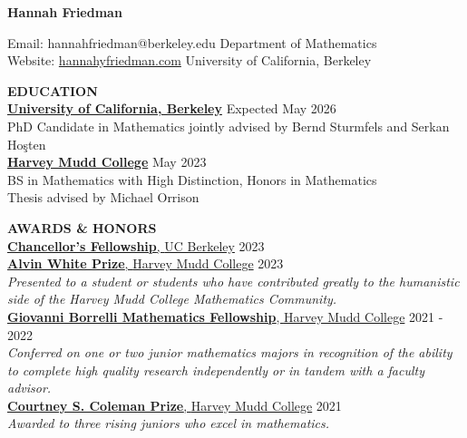 \documentclass[11pt]{article}
\newcommand{\hdr}[1]{\textcolor{blue(ryb)}{\textbf{#1}}}
\newcommand{\role}[3]{\underline{\textbf{#1}, {#2}} \hfill #3}
\begin{document}
\begin{center}
\hdr{\Large{Hannah Friedman}}\\
\end{center}
Email: hannahfriedman@berkeley.edu \hfill Department of Mathematics\\
Website: \url{hannahyfriedman.com} \hfill University of California, Berkeley

\bigskip
\raggedright
\hdr{EDUCATION}\\
\textbf{\underline{University of California, Berkeley}} \hfill Expected May 2026\\
PhD Candidate in Mathematics jointly advised by Bernd Sturmfels and Serkan Ho\c{s}ten\\
\textbf{\underline{Harvey Mudd College}} \hfill May 2023\\
BS in Mathematics with High Distinction, Honors in Mathematics\\
Thesis advised by Michael Orrison

\bigskip

\hdr{AWARDS \& HONORS}\\
\role{Chancellor's Fellowship}{UC Berkeley}{2023}\\
\role{Alvin White Prize}{Harvey Mudd College}{2023}\\
\textit{Presented to a student or students who have contributed greatly to the humanistic side of the Harvey Mudd College Mathematics Community.}\\
\role{Giovanni Borrelli Mathematics Fellowship}{Harvey Mudd College}{2021 - 2022}\\
\textit{Conferred on one or two junior mathematics majors in recognition of the ability to complete high quality research independently or in tandem with a faculty advisor.}\\
\role{Courtney S. Coleman Prize}{Harvey Mudd College}{2021}\\
\textit{Awarded to three rising juniors who excel in mathematics.}

\bigskip
\end{document}
